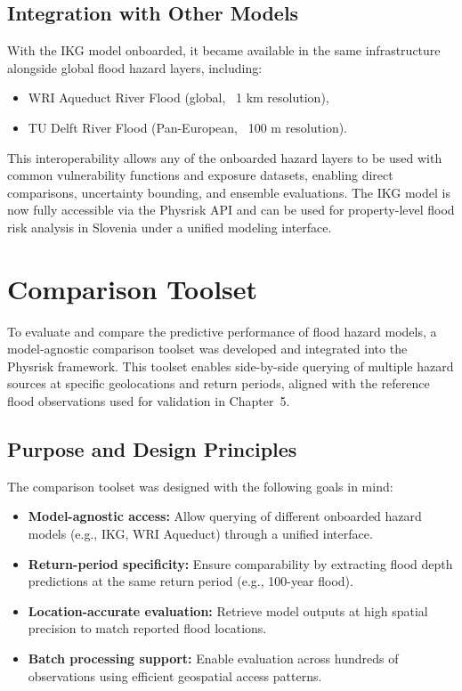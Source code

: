 \subsection{Integration with Other Models}

With the IKG model onboarded, it became available in the same infrastructure alongside global flood hazard layers, including:
\begin{itemize}
    \item WRI Aqueduct River Flood (global, ~1 km resolution),
    \item TU Delft River Flood (Pan-European, ~100 m resolution).
\end{itemize}

This interoperability allows any of the onboarded hazard layers to be used with common vulnerability functions and exposure datasets, enabling direct comparisons, uncertainty bounding, and ensemble evaluations. The IKG model is now fully accessible via the Physrisk API and can be used for property-level flood risk analysis in Slovenia under a unified modeling interface.

\section{Comparison Toolset}
\label{sec:comparison-toolset}

To evaluate and compare the predictive performance of flood hazard models, a model-agnostic comparison toolset was developed and integrated into the Physrisk framework. This toolset enables side-by-side querying of multiple hazard sources at specific geolocations and return periods, aligned with the reference flood observations used for validation in Chapter~5.

\subsection{Purpose and Design Principles}

The comparison toolset was designed with the following goals in mind:
\begin{itemize}
    \item \textbf{Model-agnostic access:} Allow querying of different onboarded hazard models (e.g., IKG, WRI Aqueduct) through a unified interface.
    \item \textbf{Return-period specificity:} Ensure comparability by extracting flood depth predictions at the same return period (e.g., 100-year flood).
    \item \textbf{Location-accurate evaluation:} Retrieve model outputs at high spatial precision to match reported flood locations.
    \item \textbf{Batch processing support:} Enable evaluation across hundreds of observations using efficient geospatial access patterns.
\end{itemize}

